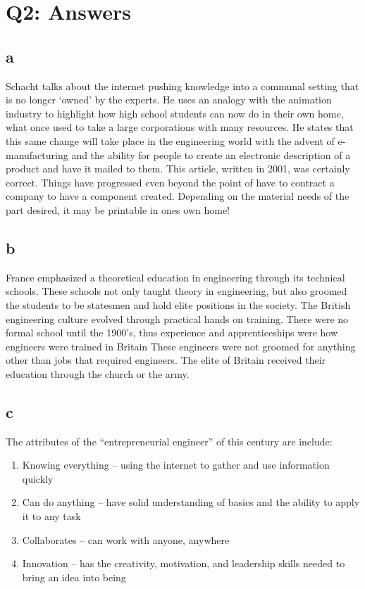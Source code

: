 \documentclass[12pt]{article} %
\begin{document}
\section{Q2: Answers}

	\subsection{a}
		Schacht talks about the internet pushing knowledge into a communal setting that is no longer ‘owned’ by the experts. He uses an analogy with the animation industry to highlight how high school students can now do in their own home, what once used to take a large corporations with many resources. He states that this same change will take place in the engineering world with the advent of e-manufacturing and the ability for people to create an electronic description of a product and have it mailed to them. This article, written in 2001, was certainly correct. Things have progressed even beyond the point of have to contract a company to have a component created. Depending on the material needs of the part desired, it may be printable in ones own home!

	\subsection{b}
		France emphasized a theoretical education in engineering through its technical schools. These schools not only taught theory in engineering, but also groomed the students to be statesmen and hold elite positions in the society. The British engineering culture evolved through practical hands on training. There were no formal school until the 1900's, thus experience and apprenticeships were how engineers were trained in Britain These engineers were not groomed for anything other than jobs that required engineers. The elite of Britain received their education through the church or the army. 

	\subsection{c}
		The attributes of the “entrepreneurial engineer” of this century are include:
		\begin{enumerate}
			\item Knowing everything – using the internet to gather and use information quickly
			\item Can do anything – have solid understanding of basics and the ability to apply it to any task
			\item Collaborates – can work with anyone, anywhere
			\item Innovation – has the creativity, motivation, and leadership skills needed to bring an idea into being
		\end{enumerate}
\end{document}
